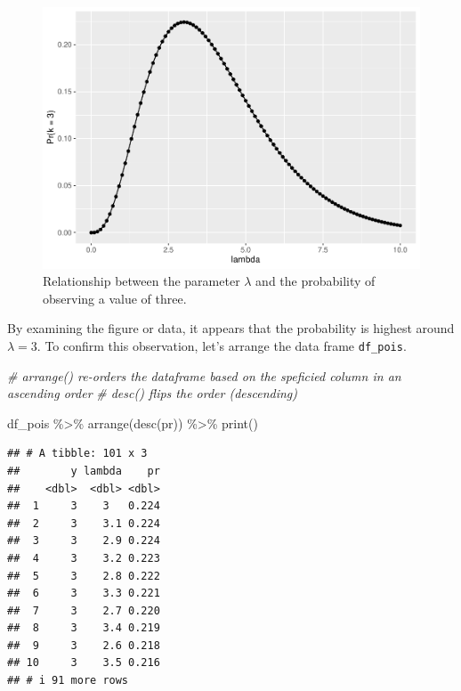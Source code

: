 \documentclass[
]{article}
\newenvironment{Shaded}{\begin{snugshade}}{\end{snugshade}}
\newcommand{\CommentTok}[1]{\textcolor[rgb]{0.56,0.35,0.01}{\textit{#1}}}
\newcommand{\FunctionTok}[1]{\textcolor[rgb]{0.00,0.00,0.00}{#1}}
\newcommand{\NormalTok}[1]{#1}
\newcommand{\SpecialCharTok}[1]{\textcolor[rgb]{0.00,0.00,0.00}{#1}}
\begin{document}
\begin{figure}

{\centering \includegraphics{biostats_files/figure-latex/dpois-plot-1} 

}

\caption{Relationship between the parameter $\lambda$ and the probability of observing a value of three.}\label{fig:dpois-plot}
\end{figure}

By examining the figure or data, it appears that the probability is highest around \(\lambda = 3\). To confirm this observation, let's arrange the data frame \texttt{df\_pois}.

\begin{Shaded}
\begin{Highlighting}[]
\CommentTok{\# arrange() re{-}orders the dataframe based on the speficied column in an ascending order}
\CommentTok{\# desc() flips the order (descending)}

\NormalTok{df\_pois }\SpecialCharTok{\%\textgreater{}\%} 
  \FunctionTok{arrange}\NormalTok{(}\FunctionTok{desc}\NormalTok{(pr)) }\SpecialCharTok{\%\textgreater{}\%} 
  \FunctionTok{print}\NormalTok{()}
\end{Highlighting}
\end{Shaded}

\begin{verbatim}
## # A tibble: 101 x 3
##        y lambda    pr
##    <dbl>  <dbl> <dbl>
##  1     3    3   0.224
##  2     3    3.1 0.224
##  3     3    2.9 0.224
##  4     3    3.2 0.223
##  5     3    2.8 0.222
##  6     3    3.3 0.221
##  7     3    2.7 0.220
##  8     3    3.4 0.219
##  9     3    2.6 0.218
## 10     3    3.5 0.216
## # i 91 more rows
\end{verbatim}
\end{document}
